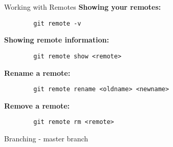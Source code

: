 \begin{frame}[fragile]{Working with Remotes}
    \textbf{Showing your remotes:}
    \begin{lstlisting}
        git remote -v
    \end{lstlisting}
    \textbf{Showing remote information:}
    \begin{lstlisting}
        git remote show <remote>
    \end{lstlisting}
    \textbf{Rename a remote:}
    \begin{lstlisting}
        git remote rename <oldname> <newname>
    \end{lstlisting}
    \textbf{Remove a remote:}
    \begin{lstlisting}
        git remote rm <remote>
    \end{lstlisting}

\end{frame}



\begin{frame}[fragile]{Branching - master branch}
    \begin{minipage}{0.49\textwidth}
        \begin{figure}
        \end{figure}
    \end{minipage}
    \begin{minipage}{0.49\textwidth}
        \begin{itemize}
        \end{itemize}
    \end{minipage}
\end{frame}

